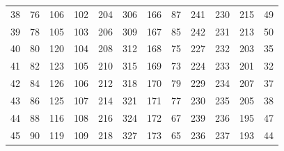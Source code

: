 \begin{table}[]
\begin{tabular}{llllllllllll}
38                     & 76                     & 106                    & 102                    & 204                    & 306                    & 166                    & 87                     & 241                    & 230                    & 215                    & 49                     \\
39                     & 78                     & 105                    & 103                    & 206                    & 309                    & 167                    & 85                     & 242                    & 231                    & 213                    & 50                     \\
40                     & 80                     & 120                    & 104                    & 208                    & 312                    & 168                    & 75                     & 227                    & 232                    & 203                    & 35                     \\
41                     & 82                     & 123                    & 105                    & 210                    & 315                    & 169                    & 73                     & 224                    & 233                    & 201                    & 32                     \\
42                     & 84                     & 126                    & 106                    & 212                    & 318                    & 170                    & 79                     & 229                    & 234                    & 207                    & 37                     \\
43                     & 86                     & 125                    & 107                    & 214                    & 321                    & 171                    & 77                     & 230                    & 235                    & 205                    & 38                     \\
44                     & 88                     & 116                    & 108                    & 216                    & 324                    & 172                    & 67                     & 239                    & 236                    & 195                    & 47                     \\
45                     & 90                     & 119                    & 109                    & 218                    & 327                    & 173                    & 65                     & 236                    & 237                    & 193                    & 44                     \\

\end{tabular}
\end{table}
